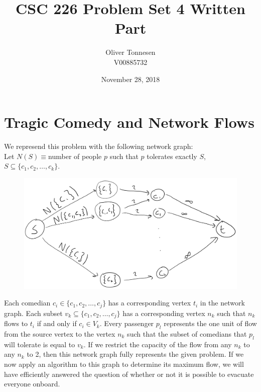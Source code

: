 \documentclass{article}
\title{CSC 226 Problem Set 4 Written Part}
\author{%
	Oliver Tonnesen\\
	V00885732}
\date{November 28, 2018}
\begin{document}
\maketitle
\section{Tragic Comedy and Network Flows}
We represend this problem with the following network graph:\\
Let $N(S)\equiv$number of people $p$ such that $p$ tolerates exactly $S$, $S\subseteq\{c_1,c_2,\ldots,c_k\}$.
\newline
\newline
\begin{figure}[h]
	\includegraphics[scale=0.4]{NetGraph.png}
\end{figure}
\newline
\newline
Each comedian $c_i\in\{c_1,c_2,\ldots,c_j\}$ has a corresponding vertex $t_i$
in the network graph. Each subset $v_k\subseteq\{c_1,c_2,\ldots,c_j\}$ has a
corresponding vertex $n_k$ such that $n_k$ flows to $t_i$ if and only if
$c_i\in V_k$. Every passenger $p_l$ represents the one unit of flow from the
source vertex to the vertex $n_k$ such that the subset of comedians that $p_l$
will tolerate is equal to $v_k$.
\newline
\newline
If we restrict the capacity of the flow from any $n_k$ to any $n_k$ to 2, then
this network graph fully represents the given problem. If we now apply an
algorithm to this graph to determine its maximum flow, we will have efficiently
answered the question of whether or not it is possible to evacuate everyone
onboard.
\end{document}
